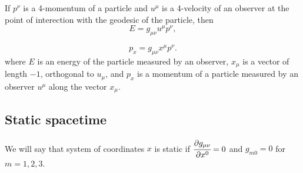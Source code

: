 \documentclass[main.tex]{subfiles}
\begin{document}
\begin{fact}
If $p^\nu$ is a 4-momentum of a particle and $u^\mu$ is a 4-velocity of an observer at the point of interection with the geodesic of the particle, then
\begin{equation}
E = g_{\mu\nu} u^\mu p^\nu, 
\end{equation}

\begin{equation}
p_x = g_{\mu\nu} x^\mu p^\nu.
\end{equation}
where $E$ is an energy of the particle measured by an observer, $x_\mu$ is a vector of length $-1$, orthogonal to $u_\mu$, and $p_x$ is a momentum of a particle measured by an observer $u^\mu$ along the vector $x_\mu$.  
\end{fact}

\subsection{Static spacetime}

\begin{definition}
We will say that system of coordinates $x$ is static if $\cfrac{\partial g_{\mu\nu}}{\partial x^0} = 0$ and $g_{m0} = 0$ for $m=1,2,3$.
\end{definition}
\end{document}
